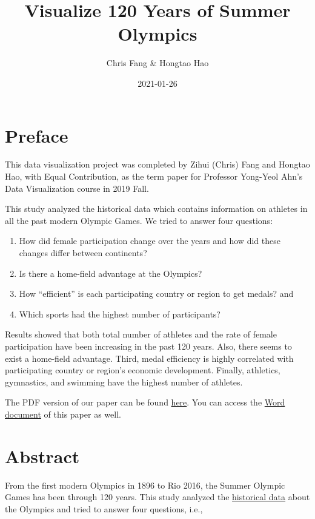 \documentclass[
]{article}
\title{Visualize 120 Years of Summer Olympics}
\author{Chris Fang \& Hongtao Hao}
\date{2021-01-26}
\begin{document}
\maketitle

{
\setcounter{tocdepth}{2}
\tableofcontents
}
\hypertarget{preface}{%
\section*{Preface}\label{preface}}

This data visualization project was completed by Zihui (Chris) Fang and Hongtao Hao, with Equal Contribution, as the term paper for Professor Yong-Yeol Ahn's Data Visualization course in 2019 Fall.

This study analyzed the historical data which contains information on athletes in all the past modern Olympic Games. We tried to answer four questions:

\begin{enumerate}
\def\labelenumi{\arabic{enumi}.}
\item
  How did female participation change over the years and how did these changes differ between continents?
\item
  Is there a home-field advantage at the Olympics?
\item
  How ``efficient'' is each participating country or region to get medals? and
\item
  Which sports had the highest number of participants?
\end{enumerate}

Results showed that both total number of athletes and the rate of female participation have been increasing in the past 120 years. Also, there seems to exist a home-field advantage. Third, medal efficiency is highly correlated with participating country or region's economic development. Finally, athletics, gymnastics, and swimming have the highest number of athletes.

The PDF version of our paper can be found \href{_book/olymvis-bookdown.pdf}{here}. You can access the \href{_book/olymvis-bookdown.docx}{Word document} of this paper as well.

\hypertarget{abstract}{%
\section*{Abstract}\label{abstract}}

From the first modern Olympics in 1896 to Rio 2016, the Summer Olympic Games has been through 120 years. This study analyzed the \href{https://github.com/rgriff23/Olympic_history}{historical data} about the Olympics and tried to answer four questions, i.e.,
\end{document}
